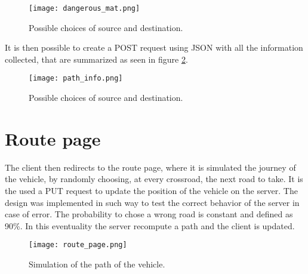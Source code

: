 \begin{figure}[!htb]
	\centering
	\texttt{[image: dangerous\_mat.png]}
	\caption{Possible choices of source and destination.}\label{Fig:dangerous_mat}
\end{figure}

It is then possible to create a POST request using JSON with all the information collected, that are summarized as seen in figure \ref{Fig:path_info}.

\begin{figure}[!htb]
	\centering
	\texttt{[image: path\_info.png]}
	\caption{Possible choices of source and destination.}\label{Fig:path_info}
\end{figure}

\newpage
\section{Route page}
The client then redirects to the route page, where it is simulated the journey of the vehicle, by randomly choosing, at every crossroad, the next road to take.
It is the used a PUT request to update the position of the vehicle on the server.
The design was implemented in such way to test the correct behavior of the server in case of error.
The probability to chose a wrong road is constant and defined as 90\%. In this eventuality the server recompute a path and the client is updated.

\begin{figure}[!htb]
	\centering
	\texttt{[image: route\_page.png]}
	\caption{Simulation of the path of the vehicle.}\label{Fig:route}
\end{figure}
